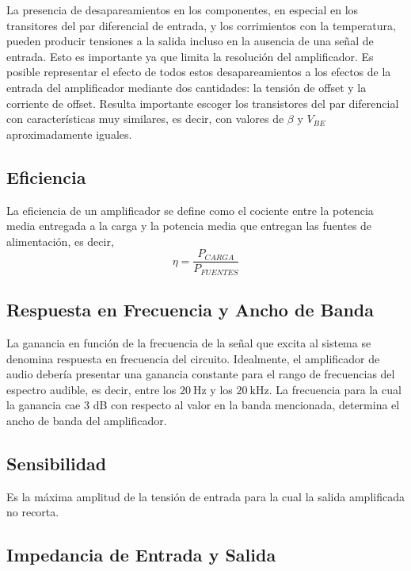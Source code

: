 \documentclass[a4paper,12pt,twoside]{article}
\newcommand{\Hz}{\ensuremath{~\mathrm{Hz}}}
\newcommand{\kHz}{\ensuremath{~\mathrm{kHz}}}
\begin{document}
La presencia de desapareamientos en los componentes, en especial en los transitores del par diferencial de entrada, y los corrimientos con la temperatura, pueden producir tensiones a la salida incluso en la ausencia de una señal de entrada. Esto es importante ya que limita la resolución del amplificador. Es posible representar el efecto de todos estos desapareamientos a los efectos de la entrada del amplificador mediante dos cantidades: la tensión de offset y la corriente de offset. Resulta importante escoger los transistores del par diferencial con características muy similares, es decir, con valores de $\beta$ y $V_{BE}$ aproximadamente iguales.

\subsection{Eficiencia}

La eficiencia de un amplificador se define como el cociente entre la potencia media entregada a la carga y la potencia media que entregan las fuentes de alimentación, es decir,
\begin{equation} \eta = \frac{P_{CARGA}}{P_{FUENTES}} \end{equation}

\subsection{Respuesta en Frecuencia y Ancho de Banda}

La ganancia en función de la frecuencia de la señal que excita al sistema se denomina respuesta en frecuencia del circuito. Idealmente, el amplificador de audio debería presentar una ganancia constante para el rango de frecuencias del espectro audible, es decir, entre los $20\Hz$ y los $20\kHz$. La frecuencia para la cual la ganancia cae $3$ dB con respecto al valor en la banda mencionada, determina el ancho de banda del amplificador.

\subsection{Sensibilidad}

Es la máxima amplitud de la tensión de entrada para la cual la salida amplificada no recorta.

\subsection{Impedancia de Entrada y Salida}
\end{document}

